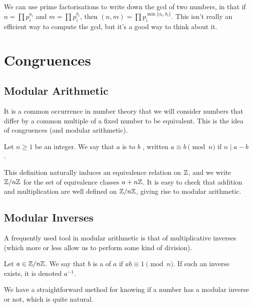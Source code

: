 \documentclass[a4paper]{scrartcl}
\begin{document}
We can use prime factorisations to write down the gcd of two numbers, in that if $n = \prod p_i^{a_i}$ and $m = \prod p_i^{b_i}$, then $(n, m) = \prod p_i^{\min\{a_i, b_i\}}$.
This isn't really an efficient way to compute the gcd, but it's a good way to think about it. 

\section{Congruences}

\subsection{Modular Arithmetic}

It is a common occurrence in number theory that we will consider numbers that differ by a common multiple of a fixed number to be equivalent. This is the idea of congruences (and modular arithmetic).

\begin{definition}[Congruence]
  Let $n \geq 1$ be an integer. We say that $a$ is  to $b$ , written $a \equiv b \pmod n$ if $n \mid a - b$.
\end{definition}

This definition naturally induces an equivalence relation on $\mathbb{Z}$, and we write $\mathbb{Z}/n\mathbb{Z}$ for the set of equivalence classes $a + n\mathbb{Z}$. It is easy to check that addition and multiplication are well defined on $\mathbb{Z}/n\mathbb{Z}$, giving rise to modular arithmetic.

\subsection{Modular Inverses}

A frequently used tool in modular arithmetic is that of multiplicative inverses (which more or less allow us to perform some kind of division). 

\begin{definition}
  Let $a \in \mathbb{Z}/n\mathbb{Z}$. We say that $b$ is a  of $a$ if $ab \equiv 1 \pmod{n}$. If such an inverse exists, it is denoted $a^{-1}$.
\end{definition}

We have a straightforward method for knowing if a number has a modular inverse or not, which is quite natural.
\end{document}
